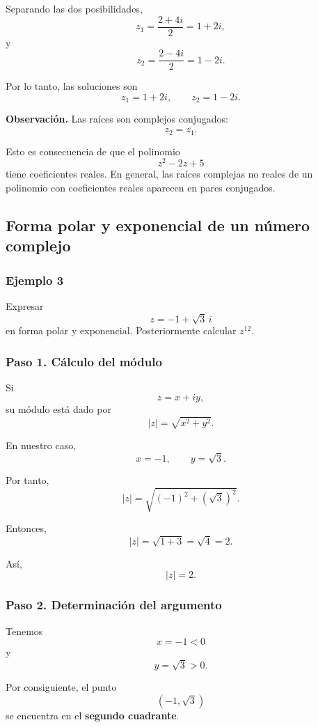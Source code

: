 \documentclass[12pt]{article}
\begin{document}
Separando las dos posibilidades,
\[
z_1
=
\frac{2+4i}{2}
=
1+2i,
\]
y
\[
z_2
=
\frac{2-4i}{2}
=
1-2i.
\]

Por lo tanto, las soluciones son
\[
\boxed{
z_1=1+2i,
\qquad
z_2=1-2i
}.
\]

\medskip

\noindent
\textbf{Observación.}
Las raíces son complejos conjugados:
\[
z_2=\overline{z_1}.
\]

Esto es consecuencia de que el polinomio
\[
z^2-2z+5
\]
tiene coeficientes reales. En general, las raíces complejas no
reales de un polinomio con coeficientes reales aparecen en pares
conjugados.

\subsection{Forma polar y exponencial de un número complejo}

\subsubsection*{Ejemplo 3}

Expresar
\[
z=-1+\sqrt{3}\,i
\]
en forma polar y exponencial. Posteriormente calcular $z^{12}$.

\subsubsection*{Paso 1. Cálculo del módulo}

Si
\[
z=x+iy,
\]
su módulo está dado por
\[
|z|
=
\sqrt{x^2+y^2}.
\]

En nuestro caso,
\[
x=-1,
\qquad
y=\sqrt{3}.
\]

Por tanto,
\[
|z|
=
\sqrt{(-1)^2+(\sqrt{3})^2}.
\]

Entonces,
\[
|z|
=
\sqrt{1+3}
=
\sqrt{4}
=
2.
\]

Así,
\[
\boxed{|z|=2}.
\]

\subsubsection*{Paso 2. Determinación del argumento}

Tenemos
\[
x=-1<0
\]
y
\[
y=\sqrt{3}>0.
\]

Por consiguiente, el punto
\[
(-1,\sqrt{3})
\]
se encuentra en el \textbf{segundo cuadrante}.
\end{document}

